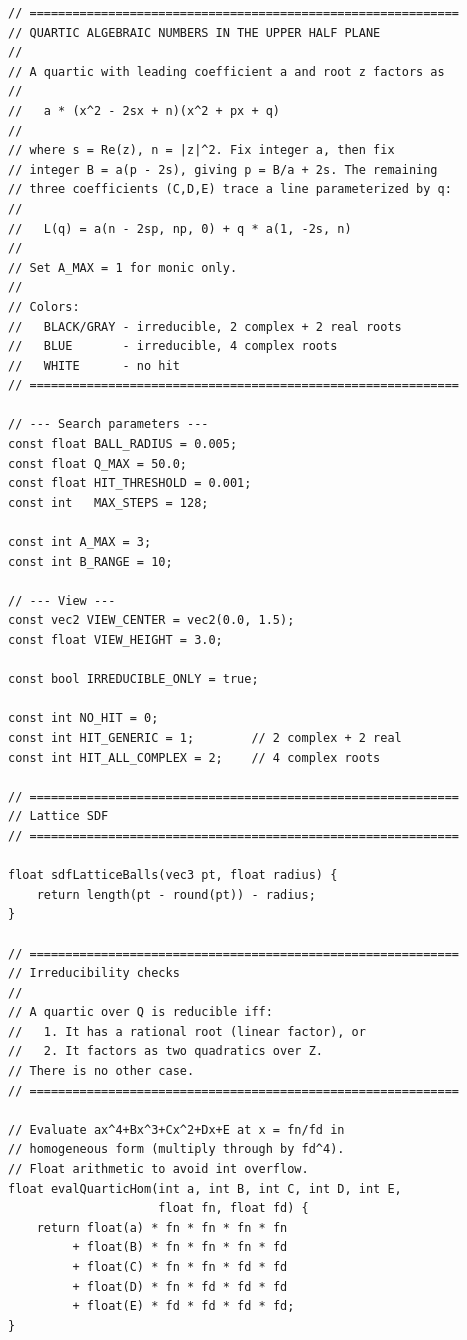 \documentclass[11pt]{article}
\begin{document}
\begin{lstlisting}
// ============================================================
// QUARTIC ALGEBRAIC NUMBERS IN THE UPPER HALF PLANE
//
// A quartic with leading coefficient a and root z factors as
//
//   a * (x^2 - 2sx + n)(x^2 + px + q)
//
// where s = Re(z), n = |z|^2. Fix integer a, then fix
// integer B = a(p - 2s), giving p = B/a + 2s. The remaining
// three coefficients (C,D,E) trace a line parameterized by q:
//
//   L(q) = a(n - 2sp, np, 0) + q * a(1, -2s, n)
//
// Set A_MAX = 1 for monic only.
//
// Colors:
//   BLACK/GRAY - irreducible, 2 complex + 2 real roots
//   BLUE       - irreducible, 4 complex roots
//   WHITE      - no hit
// ============================================================

// --- Search parameters ---
const float BALL_RADIUS = 0.005;
const float Q_MAX = 50.0;
const float HIT_THRESHOLD = 0.001;
const int   MAX_STEPS = 128;

const int A_MAX = 3;
const int B_RANGE = 10;

// --- View ---
const vec2 VIEW_CENTER = vec2(0.0, 1.5);
const float VIEW_HEIGHT = 3.0;

const bool IRREDUCIBLE_ONLY = true;

const int NO_HIT = 0;
const int HIT_GENERIC = 1;        // 2 complex + 2 real
const int HIT_ALL_COMPLEX = 2;    // 4 complex roots

// ============================================================
// Lattice SDF
// ============================================================

float sdfLatticeBalls(vec3 pt, float radius) {
    return length(pt - round(pt)) - radius;
}

// ============================================================
// Irreducibility checks
//
// A quartic over Q is reducible iff:
//   1. It has a rational root (linear factor), or
//   2. It factors as two quadratics over Z.
// There is no other case.
// ============================================================

// Evaluate ax^4+Bx^3+Cx^2+Dx+E at x = fn/fd in
// homogeneous form (multiply through by fd^4).
// Float arithmetic to avoid int overflow.
float evalQuarticHom(int a, int B, int C, int D, int E,
                     float fn, float fd) {
    return float(a) * fn * fn * fn * fn
         + float(B) * fn * fn * fn * fd
         + float(C) * fn * fn * fd * fd
         + float(D) * fn * fd * fd * fd
         + float(E) * fd * fd * fd * fd;
}


\end{lstlisting}
\end{document}

